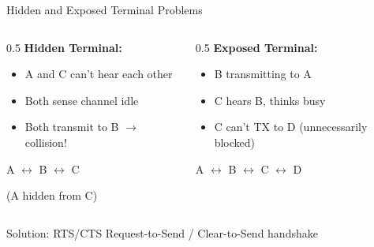 \documentclass[aspectratio=169,11pt]{beamer}
\begin{document}
\begin{frame}{Hidden and Exposed Terminal Problems}
    \begin{columns}[T]
        \begin{column}{0.5\textwidth}
            \textbf{Hidden Terminal:}
            \begin{itemize}
                \item A and C can't hear each other
                \item Both sense channel idle
                \item Both transmit to B $\rightarrow$ collision!
            \end{itemize}
            
            \vspace{0.2cm}
            A $\leftrightarrow$ B $\leftrightarrow$ C
            
            (A hidden from C)
        \end{column}
        \begin{column}{0.5\textwidth}
            \textbf{Exposed Terminal:}
            \begin{itemize}
                \item B transmitting to A
                \item C hears B, thinks busy
                \item C can't TX to D (unnecessarily blocked)
            \end{itemize}
            
            \vspace{0.2cm}
            A $\leftrightarrow$ B $\leftrightarrow$ C $\leftrightarrow$ D
        \end{column}
    \end{columns}
    
    \vspace{0.3cm}
    \begin{block}{Solution: RTS/CTS}
        Request-to-Send / Clear-to-Send handshake
    \end{block}
\end{frame}
\end{document}
